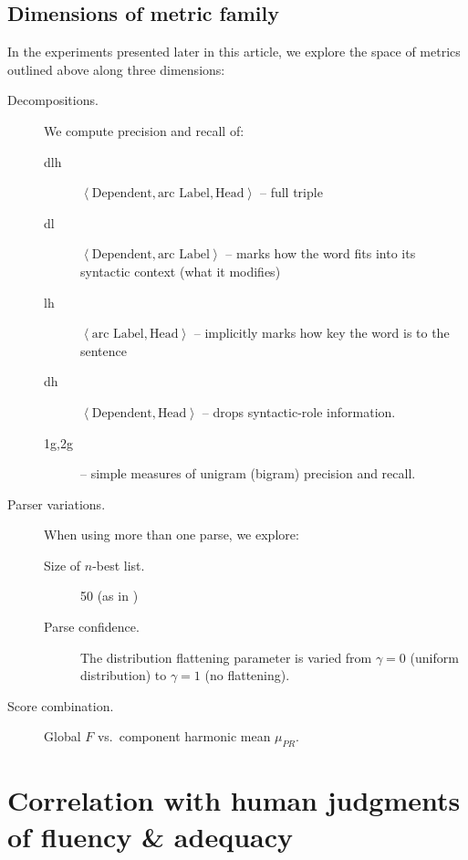 \documentclass{kluwer}    %
\begin{document}
\begin{article}
\subsection{Dimensions of metric family}
\label{sec:metricdimensions}
In the experiments presented later in this article, we explore the
space of metrics outlined above along three dimensions:
\begin{description}
\item[Decompositions.] We compute precision and recall of:
  \begin{description}
  \item[dlh] $\left\langle \textrm{Dependent}, \textrm{arc Label},
      \textrm{Head}\right\rangle$ -- full triple
  \item[dl] $\left\langle \textrm{Dependent}, \textrm{arc Label}
      \right\rangle$ --  marks how the word
      fits into its syntactic context (what it modifies)
    \item[lh] $\left\langle \textrm{arc Label}, \textrm{Head}
      \right\rangle$ --  implicitly marks how
      key the word is to the sentence
    \item[dh] $\left\langle \textrm{Dependent}, \textrm{Head}
      \right\rangle$ -- drops syntactic-role information.
    \item[1g,2g] -- simple measures of unigram
      (bigram) precision and recall.
  \end{description}
\item[Parser variations.] When using more than one parse, we explore:
  \begin{description}
  \item[Size of $n$-best list.] 50 (as in \cite{owczarzak07evaluatingmt})
  \item[Parse confidence.] The distribution flattening
    parameter is varied from $\gamma=0$ (uniform distribution) to $\gamma=1$
    (no flattening).
  \end{description}
\item[Score combination.] Global $F$ vs.\ component harmonic mean $\mu_{PR}$.
\end{description}

\section{Correlation with human judgments of fluency \& adequacy}
\label{sec:faexpts}


\end{article}
\end{document}
